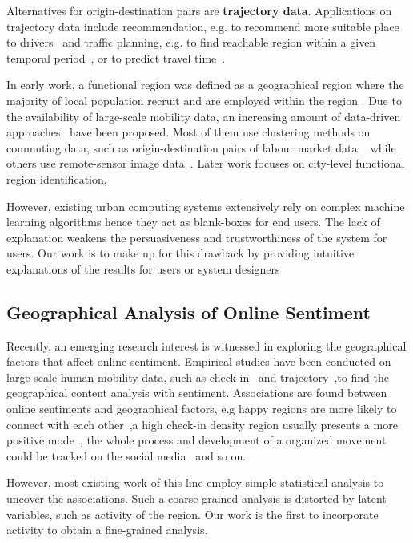 \documentclass[runningheads]{llncs}
\begin{document}
Alternatives for origin-destination pairs are \textbf{trajectory data}.
Applications on trajectory data include recommendation, e.g. to recommend more suitable place to drivers~\cite{Ge2011TaxiBusiness,Garg2018Route} and traffic planning, e.g. to find reachable region within a given temporal period~\cite{Wu2017Reachable}, %
or to predict travel time~\cite{Wang2018Deep}.

In early work, a functional region was defined as a geographical region where the majority of local population recruit and are employed within the region \cite{Ball1980Definition}.
Due to the availability of large-scale mobility data, an increasing amount of data-driven approaches~\cite{Farmer2009Overview} have been proposed.
Most of them use clustering methods on commuting data, such as origin-destination pairs of labour market data ~\cite{Karlsson2006FunctionalRegionSummary} while others use remote-sensor image data~\cite{Vatsavai2011Remote}.
Later work focuses on city-level functional region identification,

However, existing urban computing systems extensively rely on complex machine learning algorithms hence they act as blank-boxes for end users.
The lack of explanation weakens the persuasiveness and trustworthiness of the system for users.
Our work is to make up for this drawback by providing intuitive explanations of the results for users or system designers

\subsection{Geographical Analysis of Online Sentiment}

Recently, an emerging research interest is witnessed in exploring the geographical factors that affect online sentiment.
Empirical studies have been conducted on large-scale human mobility data, such as check-in ~\cite{Gallegos16happier}and trajectory~\cite{Gonzlez2008Track},to find the geographical content analysis with sentiment.
Associations are found between online sentiments and geographical factors, e.g happy regions are more likely to connect with each other~\cite{Alshamsi15milan},a high check-in density region usually presents a more positive mode~\cite{Gallegos16happier}, the whole process and development of a organized movement could be tracked on the social media~\cite{Alvarez2015Movement} and so on.

However, most existing work of this line employ simple statistical analysis to uncover the associations.
Such a coarse-grained analysis is distorted by latent variables, such as activity of the region.
Our work is the first to incorporate activity to obtain a fine-grained analysis.
\end{document}

